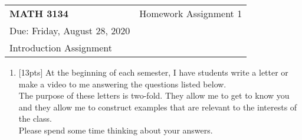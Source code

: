 \documentclass[english]{article}
\providecommand{\tabularnewline}{\\}
\begin{document}
\textbf{\Large }%
\begin{tabular}{>{\raggedright}p{5cm}>{\raggedleft}p{12.85cm}}
\textbf{\Large \hspace{-10mm}MATH 3134} & Homework Assignment 1\\
Due: Friday, August 28, 2020\\
Introduction Assignment\tabularnewline
\end{tabular}{\Large \par}
\begin{enumerate}
\item\hspace*{0mm}[13pts] At the beginning of each semester, I have students write a letter or make a video to me answering the questions listed below. \\ The purpose of these letters is two-fold.  They allow me to get to know you and they allow me to construct examples that are relevant to the interests of the class.\\
Please spend some time thinking about your answers.


\end{enumerate}
\end{document}
